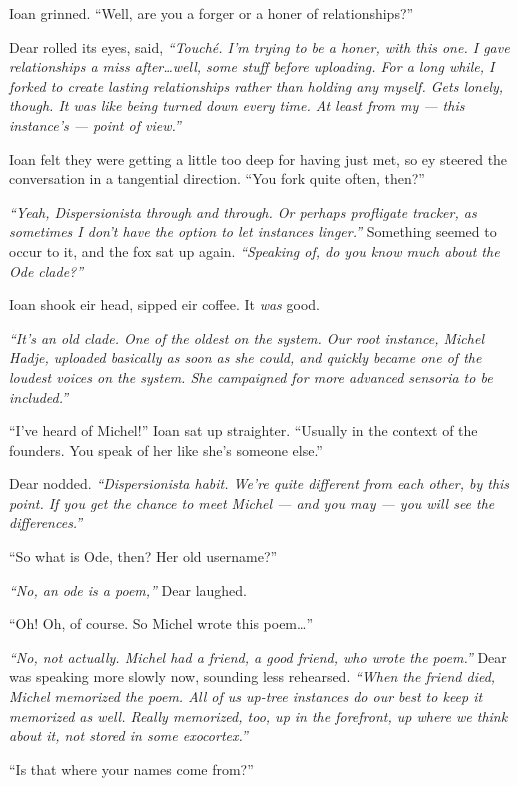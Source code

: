 Ioan grinned. ``Well, are you a forger or a honer of relationships?''

Dear rolled its eyes, said, \emph{``Touché. I'm trying to be a honer, with this one. I gave relationships a miss after\ldots{}well, some stuff before uploading. For a long while, I forked to create lasting relationships rather than holding any myself. Gets lonely, though. It was like being turned down every time. At least from my --- this instance's --- point of view.''}

Ioan felt they were getting a little too deep for having just met, so ey steered the conversation in a tangential direction. ``You fork quite often, then?''

\emph{``Yeah, Dispersionista through and through. Or perhaps profligate tracker, as sometimes I don't have the option to let instances linger.''} Something seemed to occur to it, and the fox sat up again. \emph{``Speaking of, do you know much about the Ode clade?''}

Ioan shook eir head, sipped eir coffee. It \emph{was} good.

\emph{``It's an old clade. One of the oldest on the system. Our root instance, Michel Hadje, uploaded basically as soon as she could, and quickly became one of the loudest voices on the system. She campaigned for more advanced sensoria to be included.''}

``I've heard of Michel!'' Ioan sat up straighter. ``Usually in the context of the founders. You speak of her like she's someone else.''

Dear nodded. \emph{``Dispersionista habit. We're quite different from each other, by this point. If you get the chance to meet Michel --- and you may --- you will see the differences.''}

``So what is Ode, then? Her old username?''

\emph{``No, an ode is a poem,''} Dear laughed.

``Oh! Oh, of course. So Michel wrote this poem\ldots{}''

\emph{``No, not actually. Michel had a friend, a good friend, who wrote the poem.''} Dear was speaking more slowly now, sounding less rehearsed. \emph{``When the friend died, Michel memorized the poem. All of us up-tree instances do our best to keep it memorized as well. Really memorized, too, up in the forefront, up where we think about it, not stored in some exocortex.''}

``Is that where your names come from?''

